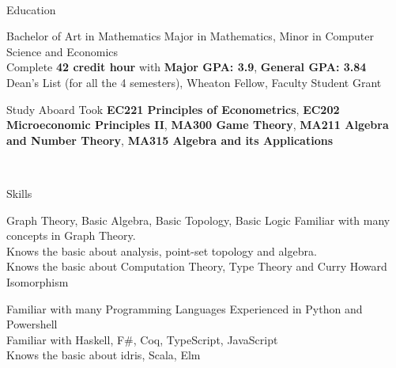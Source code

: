 \documentclass[]{resume-knyte}
\begin{document}



\begin{subheader}{1}
    \\

\end{subheader}

\begin{topic}{Education}


    {Bachelor of Art in Mathematics}
    {Major in Mathematics, Minor in Computer Science and Economics\\
    Complete \textbf{42 credit hour} with \textbf{Major GPA: 3.9}, \textbf{General GPA: 3.84}\\
    Dean's List (for all the 4 semesters), Wheaton Fellow, Faculty Student Grant}


    {Study Aboard}
    {Took
    \textbf{EC221 Principles of Econometrics},
    \textbf{EC202 Microeconomic Principles II},
    \textbf{MA300 Game Theory},
    \textbf{MA211 Algebra and Number Theory},
    \textbf{MA315 Algebra and its Applications}
    }

    \\ %
\end{topic}



\begin{topic}{Skills}


    {Graph Theory, Basic Algebra, Basic Topology, Basic Logic}
    { Familiar with many concepts in Graph Theory.\\
    Knows the basic about analysis, point-set topology and algebra.\\
    Knows the basic about Computation Theory, Type Theory and Curry Howard Isomorphism }

    {Familiar with many Programming Languages}
    {Experienced in Python and Powershell\\
    Familiar with Haskell, F\#, Coq, TypeScript, JavaScript\\
    Knows the basic about idris, Scala, Elm}


    \\ %
\end{topic}
\end{document}
